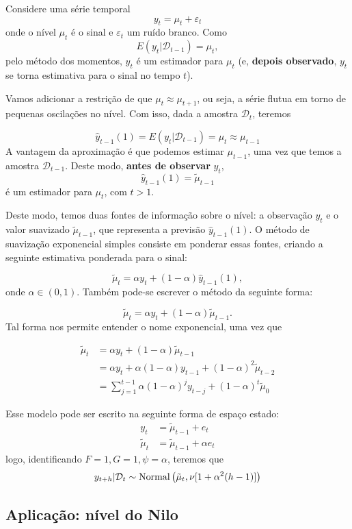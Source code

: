 \documentclass[
  letterpaper,
  DIV=11,
  numbers=noendperiod]{scrartcl}
\theoremstyle{plain}
\theoremstyle{plain}
\theoremstyle{definition}
\theoremstyle{definition}
\theoremstyle{remark}
\begin{document}
Considere uma série temporal \[y_t = \mu_t+\varepsilon_t\] onde o nível
\(\mu_t\) é o sinal e \(\varepsilon_t\) um ruído branco. Como
\[E(y_t|\mathcal{D}_{t-1})=\mu_t,\] pelo método dos momentos, \(y_t\) é
um estimador para \(\mu_t\) (e, \textbf{depois observado}, \(y_t\) se
torna estimativa para o sinal no tempo \(t\)).

Vamos adicionar a restrição de que \(\mu_t\approx \mu_{t+1}\), ou seja,
a série flutua em torno de pequenas oscilações no nível. Com isso, dada
a amostra \(\mathcal{D}_t\), teremos

\[\hat{y}_{t-1}(1)=E(y_{t}|\mathcal{D}_{t-1})=\mu_{t}\approx \mu_{t-1}\]
A vantagem da aproximação é que podemos estimar \(\mu_{t-1}\), uma vez
que temos a amostra \(\mathcal{D}_{t-1}\). Deste modo, \textbf{antes de
observar} \(y_t\),\\
\[\hat{y}_{t-1}(1)=\tilde{\mu}_{t-1}\] é um estimador para \(\mu_t\),
com \(t>1\).

Deste modo, temos duas fontes de informação sobre o nível: a observação
\(y_t\) e o valor suavizado \(\tilde{\mu}_{t-1}\), que representa a
previsão \(\hat{y}_{t-1}(1)\). O método de suavização exponencial
simples consiste em ponderar essas fontes, criando a seguinte estimativa
ponderada para o sinal:

\[\tilde{\mu}_t=\alpha y_t + (1-\alpha)\hat{y}_{t-1}(1),\] onde
\(\alpha\in(0,1)\). Também pode-se escrever o método da seguinte forma:

\[\tilde{\mu}_t=\alpha y_t + (1-\alpha)\tilde{\mu}_{t-1}.\] Tal forma
nos permite entender o nome exponencial, uma vez que

\[\begin{align}\tilde{\mu}_t&=\alpha y_t + (1-\alpha)\tilde{\mu}_{t-1}\\&=\alpha y_t + \alpha(1-\alpha)y_{t-1}+(1-\alpha)^2 \tilde{\mu}_{t-2}\\&=\sum_{j=1}^{t-1}\alpha(1-\alpha)^jy_{t-j}+(1-\alpha)^t\tilde{\mu}_0\end{align}\]

Esse modelo pode ser escrito na seguinte forma de espaço estado:
\[\begin{align}
y_t&=\tilde{\mu}_{t-1}+e_t\\
\tilde{\mu}_{t}&=\tilde{\mu}_{t-1}+\alpha e_t
\end{align}\] logo, identificando \(F=1, G=1,\psi=\alpha\), teremos que
\[y_{t+h}|\mathcal{D}_t\sim\hbox{Normal}\left(\tilde{\mu}_t,\nu[1+\alpha^2(h-1)]\right)\]

\hypertarget{aplicauxe7uxe3o-nuxedvel-do-nilo}{%
\subsection{Aplicação: nível do
Nilo}\label{aplicauxe7uxe3o-nuxedvel-do-nilo}}
\end{document}
